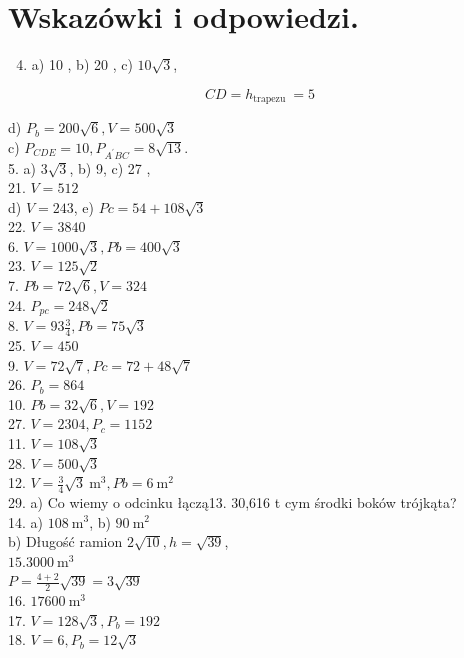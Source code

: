 \documentclass[10pt]{article}
\begin{document}
\section*{Wskazówki i odpowiedzi.}
\begin{enumerate}
  \setcounter{enumi}{3}
  \item a) 10 , b) 20 , c) \(10 \sqrt{3}\),
\end{enumerate}

\[
C D=h_{\text {trapezu }}=5
\]

d) \(P_{b}=200 \sqrt{6}, V=500 \sqrt{3}\)\\
c) \(P_{C D E}=10, P_{A^{\prime} B C}=8 \sqrt{13}\).\\
5. a) \(3 \sqrt{3}\), b) 9, c) 27 ,\\
21. \(V=512\)\\
d) \(V=243\), e) \(P c=54+108 \sqrt{3}\)\\
22. \(V=3840\)\\
6. \(V=1000 \sqrt{3}, P b=400 \sqrt{3}\)\\
23. \(V=125 \sqrt{2}\)\\
7. \(P b=72 \sqrt{6}, V=324\)\\
24. \(P_{p c}=248 \sqrt{2}\)\\
8. \(V=93 \frac{3}{4}, P b=75 \sqrt{3}\)\\
25. \(V=450\)\\
9. \(V=72 \sqrt{7}, P c=72+48 \sqrt{7}\)\\
26. \(P_{b}=864\)\\
10. \(P b=32 \sqrt{6}, V=192\)\\
27. \(V=2304, P_{c}=1152\)\\
11. \(V=108 \sqrt{3}\)\\
28. \(V=500 \sqrt{3}\)\\
12. \(V=\frac{3}{4} \sqrt{3} \mathrm{~m}^{3}, P b=6 \mathrm{~m}^{2}\)\\
29. a) Co wiemy o odcinku łączą13. 30,616 t cym środki boków trójkąta?\\
14. a) \(108 \mathrm{~m}^{3}\), b) \(90 \mathrm{~m}^{2}\)\\
b) Długość ramion \(2 \sqrt{10}, h=\sqrt{39}\),\\
\(15.3000 \mathrm{~m}^{3}\)\\
\(P=\frac{4+2}{2} \sqrt{39}=3 \sqrt{39}\)\\
16. \(17600 \mathrm{~m}^{3}\)\\
17. \(V=128 \sqrt{3}, P_{b}=192\)\\
18. \(V=6, P_{b}=12 \sqrt{3}\)\\
\end{document}
